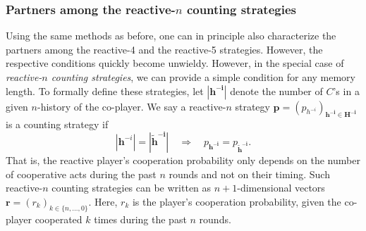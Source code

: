 \documentclass[9pt,twoside,lineno]{pnas-new}
\theoremstyle{plainCl1}
\newtheorem{corollary}{Corollary}
\theoremstyle{plainCl2}
\begin{document}
 



\noindent
\subsubsection*{Partners among the reactive-$n$ counting strategies}
Using the same methods as before, one can in principle also characterize the partners among the reactive-4 and the reactive-5 strategies. However, the  respective conditions quickly become unwieldy. 
However, in the special case of  {\it reactive-$n$ counting strategies}, we can provide a simple condition for any memory length.
To formally define these strategies, let $|\mathbf{h^{-i}}|$ denote the number of $C$'s in a given $n$-history of the co-player. 
We say a reactive-$n$ strategy $\mathbf{p}\!=\!(p_{h^{-i}})_{\mathbf{h^{-i}\in H^{-i}}}$ is a counting strategy if 
\begin{equation}
|\mathbf{h}^{-i}|\! =\! |\mathbf{\tilde h^{-i}}| \quad \Rightarrow \quad p_\mathbf{h^{-i}} = p_\mathbf{\tilde h^{-i}}. 
\end{equation} 
That is, the reactive player's cooperation probability only depends on the number of cooperative acts during the past $n$ rounds and not on their timing. 
Such reactive-$n$ counting strategies can be written as $n\!+\!1$-dimensional vectors $\mathbf{r}\!=\!(r_k)_{k\in\{n,\ldots,0\}}$.
Here, $r_k$ is the player's cooperation probability, given the co-player cooperated $k$ times during the past $n$ rounds. 
\end{document}

